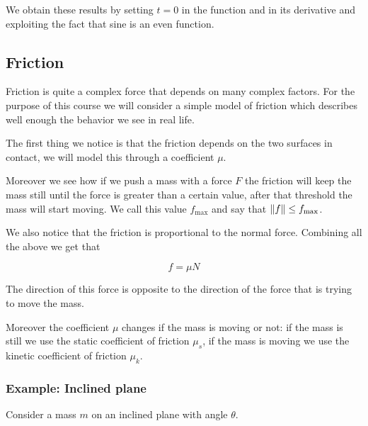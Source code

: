 \documentclass[14pt]{extarticle}
\begin{document}
We obtain these results by setting $t = 0$ in the function and in its derivative and exploiting the fact that sine is an even function.

\subsection{Friction}

Friction is quite a complex force that depends on many complex factors. For the purpose of this course we will consider a simple model of friction which describes well enough the behavior we see in real life.

The first thing we notice is that the friction depends on the two surfaces in contact, we will model this through a coefficient $\mu$.

Moreover we see how if we push a mass with a force $F$ the friction will keep the mass still until the force is greater than a certain value, after that threshold the mass will start moving.
We call this value $f_{\text{max}}$ and say that $\norm{f} \leq f_{\text{max}}$.

We also notice that the friction is proportional to the normal force. Combining all the above we get that

$$
  f = \mu N
$$

The direction of this force is opposite to the direction of the force that is trying to move the mass.

Moreover the coefficient $\mu$ changes if the mass is moving or not: if the mass is still we use the static coefficient of friction $\mu_s$, if the mass is moving we use the kinetic coefficient of friction $\mu_k$.

\subsubsection{Example: Inclined plane}

\begin{center}
\end{center}

Consider a mass $m$ on an inclined plane with angle $\theta$.
\end{document}
